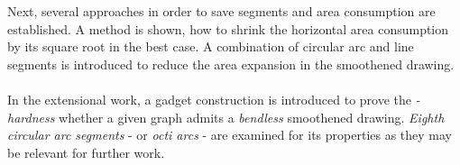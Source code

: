 \\\\
Next, several approaches in order to save segments and area consumption are established. A method is shown, how to shrink the horizontal area consumption by its square root in the best case. A combination of circular arc and line segments is introduced to reduce the area expansion in the smoothened drawing.
\\\\
In the extensional work, a gadget construction is introduced to prove the \textit{\NP-hardness} whether a given graph admits a \textit{bendless} smoothened drawing. \textit{Eighth circular arc segments} - or \textit{octi arcs} - are examined for its properties as they may be relevant for further work.

